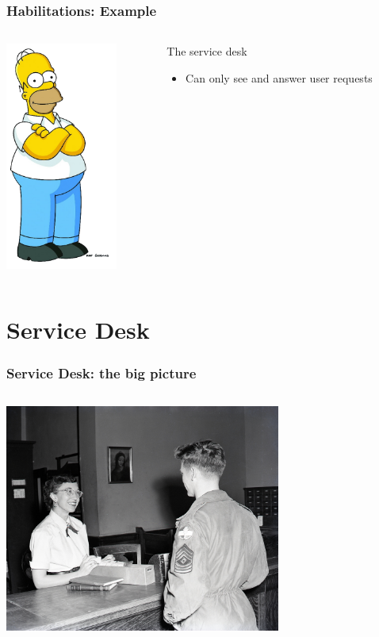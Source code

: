 \documentclass{beamer}
\begin{document}
\begin{frame}
\frametitle{Habilitations: Example}
\begin{columns}
 \begin{column}{0.45\textwidth}
         \includegraphics[height=7.5cm]{./pics/simpsons/homer.png}
 \end{column}
 \begin{column}{0.45\textwidth}
    \begin{block}{The service desk}
        \begin{itemize}
            \item Can only see and answer user requests
        \end{itemize}
    \end{block}
 \end{column}
\end{columns}
\end{frame}




\section{Service Desk}

\begin{frame}
\frametitle{Service Desk: the big picture}
\begin{columns}
\begin{column}{0.45\textwidth}
\includegraphics[height=7.5cm]{./pics/servicedesk.jpg}
\end{column}
\begin{column}{0.45\textwidth}
\end{column}
\end{columns}
\end{frame}
\end{document}
